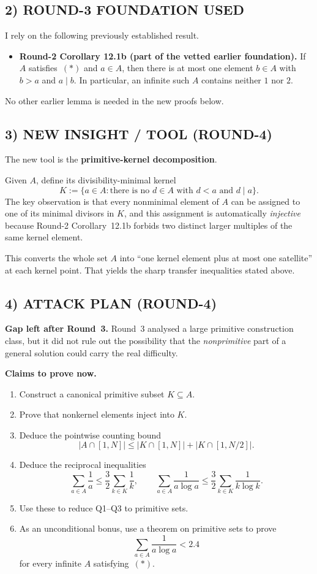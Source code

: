 \subsection*{2) ROUND-3 FOUNDATION USED}

I rely on the following previously established result.

\begin{itemize}
\item \textbf{Round-2 Corollary 12.1b (part of the vetted earlier foundation).} If $A$ satisfies~$(*)$ and $a\in A$, then there is at most one element $b\in A$ with $b>a$ and $a\mid b$. In particular, an infinite such $A$ contains neither $1$ nor $2$.
\end{itemize}

No other earlier lemma is needed in the new proofs below.

\subsection*{3) NEW INSIGHT / TOOL (ROUND-4)}

The new tool is the \textbf{primitive-kernel decomposition}.

Given $A$, define its divisibility-minimal kernel
\[
K:=\{a\in A:\text{there is no }d\in A\text{ with }d<a\text{ and }d\mid a\}.
\]
The key observation is that every nonminimal element of $A$ can be assigned to one of its minimal divisors in $K$, and this assignment is automatically \emph{injective} because Round-2 Corollary~12.1b forbids two distinct larger multiples of the same kernel element.

This converts the whole set $A$ into ``one kernel element plus at most one satellite'' at each kernel point. That yields the sharp transfer inequalities stated above.

\subsection*{4) ATTACK PLAN (ROUND-4)}

\textbf{Gap left after Round~3.}
Round~3 analysed a large primitive construction class, but it did not rule out the possibility that the \emph{nonprimitive} part of a general solution could carry the real difficulty.

\textbf{Claims to prove now.}
\begin{enumerate}
\item Construct a canonical primitive subset $K\subseteq A$.
\item Prove that nonkernel elements inject into $K$.
\item Deduce the pointwise counting bound
\[
|A\cap[1,N]|\le |K\cap[1,N]|+|K\cap[1,N/2]|.
\]
\item Deduce the reciprocal inequalities
\[
\sum_{a\in A}\frac1a\le \frac32\sum_{k\in K}\frac1k,
\qquad
\sum_{a\in A}\frac1{a\log a}\le \frac32\sum_{k\in K}\frac1{k\log k}.
\]
\item Use these to reduce Q1--Q3 to primitive sets.
\item As an unconditional bonus, use a theorem on primitive sets to prove
\[
\sum_{a\in A}\frac1{a\log a}<2.4
\]
for every infinite $A$ satisfying~$(*)$.
\end{enumerate}

